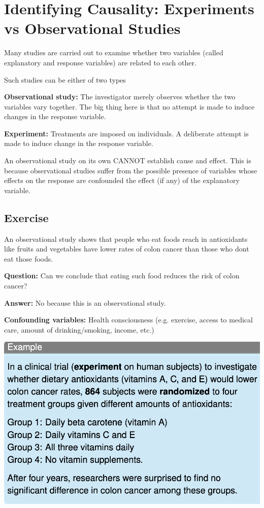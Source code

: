 \section{Identifying Causality: Experiments vs Observational Studies}

Many studies are carried out to examine whether two variables (called explanatory and response variables) are related to each other.

Such studies can be either of two types

\textbf{Observational study:} The investigator merely observes whether the two variables vary together. The big thing here is that no attempt is made to induce changes in the response variable.

\textbf{Experiment:} Treatments are imposed on individuals. A deliberate attempt is made to induce change in the response variable.

An observational study on its own CANNOT establish cause and effect. This is because observational studies suffer from the possible presence of variables whose effects on the response are confounded the effect (if any) of the explanatory variable.

\subsection{Exercise}

An observational study shows that people who eat foods reach in antioxidants like fruits and vegetables have lower rates of colon cancer than those who dont eat those foods. 

\textbf{Question:} Can we conclude that eating such food reduces the risk of colon cancer?

\textbf{Answer:} No because this is an observational study. 

\textbf{Confounding variables:} Health consciousness (e.g. exercise, access to medical care, amount of drinking/smoking, income, etc.)

\includegraphics[scale=0.5]{experiment_example}
